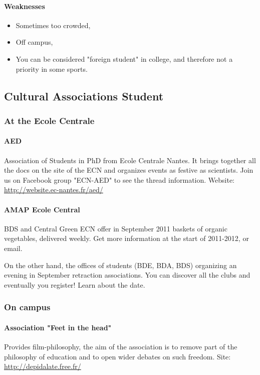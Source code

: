 \paragraph{Weaknesses}
\begin{itemize}
  \item Sometimes too crowded,
  \item Off campus,
  \item You can be considered "foreign student" in college, and therefore not a priority in some sports.
\end{itemize}

\subsection {Cultural Associations Student}
\subsubsection {At the Ecole Centrale}
\paragraph{AED} Association of Students in PhD from Ecole Centrale Nantes. It brings together all the docs on the site of the ECN and organizes events as festive as scientists. Join us on Facebook group "ECN-AED" to see the thread information. Website: \url{http://website.ec-nantes.fr/aed/}
\paragraph{AMAP Ecole Central} BDS and Central Green ECN offer in September 2011 baskets of organic vegetables, delivered weekly. Get more information at the start of 2011-2012, or email.

On the other hand, the offices of students (BDE, BDA, BDS) organizing an evening in September retraction associations. You can discover all the clubs and eventually you register! Learn about the date.

\subsubsection{On campus}
\paragraph{Association "Feet in the head"} Provides film-philosophy, the aim of the association is to remove part of the philosophy of education and to open wider debates on such freedom. Site: \url{http://depidalate.free.fr/}
